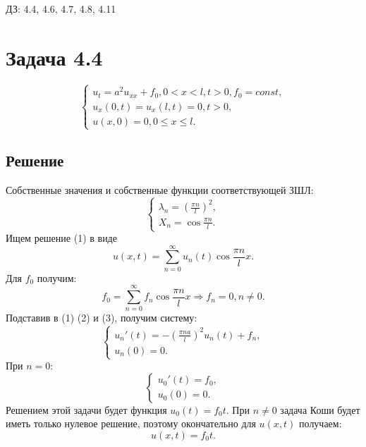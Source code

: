 \documentclass[11pt]{article}
\author{Sergey Makarov}
\date{\today}
\title{}
\begin{document}
ДЗ: 4.4, 4.6, 4.7, 4.8, 4.11

\section{Задача 4.4}
\label{sec:orgf1407aa}
\begin{equation}
\begin{cases}
u_t = a^2u_{xx} + f_0, 0 < x < l, t > 0, f_0 = const, \\
u_x(0, t) = u_x(l, t) = 0, t > 0, \\
u(x, 0) = 0, 0 \leq x \leq l.
\end{cases}
\end{equation}
\subsection{Решение}
\label{sec:org14d1382}
Собственные значения и собственные функции соответствующей ЗШЛ:
\begin{equation*}
\begin{cases}
\lambda_n = \left(\frac{\pi n}l\right)^2, \\
X_n = \cos\frac{\pi n}l.
\end{cases}
\end{equation*}
Ищем решение (1) в виде
\begin{equation}
u(x, t) = \sum_{n = 0}^{\infty}u_n(t)\cos\frac{\pi n}lx.
\end{equation}
Для $f_0$ получим:
\begin{equation}
f_0 = \sum_{n = 0}^{\infty}f_n\cos\frac{\pi n}lx \Rightarrow f_n = 0, n \neq 0.
\end{equation}
Подставив в (1) (2) и (3), получим систему:
\begin{equation*}
\begin{cases}
u_n'(t) = -\left(\frac{\pi na}l\right)^2u_n(t) + f_n, \\
u_n(0) = 0.
\end{cases}
\end{equation*}
При $n = 0$:
\begin{equation*}
\begin{cases}
u_0'(t) = f_0, \\
u_0(0) = 0.
\end{cases}
\end{equation*}
Решением этой задачи будет функция $u_0(t) = f_0t$.
При $n \neq 0$ задача Коши будет иметь только нулевое решение, поэтому окончательно для $u(x, t)$ получаем:
\begin{equation}
u(x, t) = f_0t.
\end{equation}
\end{document}
